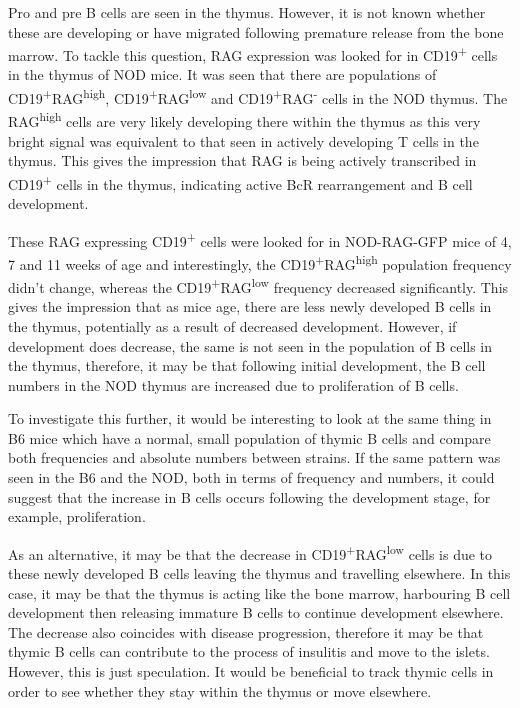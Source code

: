 Pro and pre B cells are seen in the thymus.
However, it is not known whether these are developing or have migrated following premature release from the bone marrow.
To tackle this question, RAG expression was looked for in CD19\textsuperscript{+} cells in the thymus of NOD mice.
It was seen that there are populations of CD19\textsuperscript{+}RAG\textsuperscript{high}, CD19\textsuperscript{+}RAG\textsuperscript{low} and CD19\textsuperscript{+}RAG\textsuperscript{-} cells in the NOD thymus.
The RAG\textsuperscript{high} cells are very likely developing there within the thymus as this very bright signal was equivalent to that seen in actively developing T cells in the thymus.
This gives the impression that RAG is being actively transcribed in CD19\textsuperscript{+} cells in the thymus, indicating active BcR rearrangement and B cell development.

These RAG expressing CD19\textsuperscript{+} cells were looked for in NOD-RAG-GFP mice of 4, 7 and 11 weeks of age and interestingly, the CD19\textsuperscript{+}RAG\textsuperscript{high} population frequency didn't change, whereas the CD19\textsuperscript{+}RAG\textsuperscript{low} frequency decreased significantly.
This gives the impression that as mice age, there are less newly developed B cells in the thymus, potentially as a result of decreased development.
However, if development does decrease, the same is not seen in the population of B cells in the thymus, therefore, it may be that following initial development, the B cell numbers in the NOD thymus are increased due to proliferation of B cells.

To investigate this further, it would be interesting to look at the same thing in B6 mice which have a normal, small population of thymic B cells and compare both frequencies and absolute numbers between strains.
If the same pattern was seen in the B6 and the NOD, both in terms of frequency and numbers, it could suggest that the increase in B cells occurs following the development stage, for example, proliferation.

As an alternative, it may be that the decrease in CD19\textsuperscript{+}RAG\textsuperscript{low} cells is due to these newly developed B cells leaving the thymus and travelling elsewhere.
In this case, it may be that the thymus is acting like the bone marrow, harbouring B cell development then releasing immature B cells to continue development elsewhere.
The decrease also coincides with disease progression, therefore it may be that thymic B cells can contribute to the process of insulitis and move to the islets.
However, this is just speculation.
It would be beneficial to track thymic cells in order to see whether they stay within the thymus or move elsewhere.


